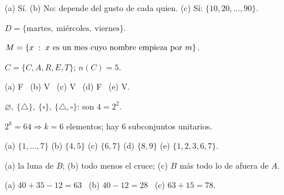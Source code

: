 \documentclass[11pt,a4paper]{article}
\begin{document}
\respuestas
\begin{respuestascortas}
\begin{soluciones}
\item (a) Sí. (b) No: depende del gusto de cada quien. (c) Sí: $\{10,20,\dots,90\}$.
\item $D=\{\text{martes},\ \text{miércoles},\ \text{viernes}\}$.
\item $M=\{x\;:\; x\text{ es un mes cuyo nombre empieza por }m\}$.
\item $C=\{C,A,R,E,T\}$; $n(C)=5$.
\item (a) F \ (b) V \ (c) V \ (d) F \ (e) V.
\item $\varnothing,\ \{\triangle\},\ \{\square\},\ \{\triangle,\square\}$: son $4=2^2$.
\item $2^{k}=64\Rightarrow k=6$ elementos; hay $6$ subconjuntos unitarios.
\item (a) $\{1,\dots,7\}$ (b) $\{4,5\}$ (c) $\{6,7\}$ (d) $\{8,9\}$ (e) $\{1,2,3,6,7\}$.
\item (a) la luna de $B$; (b) todo menos el cruce; (c) $B$ más todo lo de afuera de $A$.
\item (a) $40+35-12=63$ \ (b) $40-12=28$ \ (c) $63+15=78$.
\end{soluciones}
\end{respuestascortas}
\end{document}
